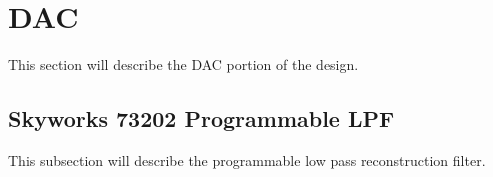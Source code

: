 \section{DAC} %
\label{sec:dac}
    This section will describe the DAC portion of the design.
    
    \subsection{Skyworks 73202 Programmable LPF} %
        \label{sec:dac-lpf}
        This subsection will describe the programmable low pass reconstruction filter.
